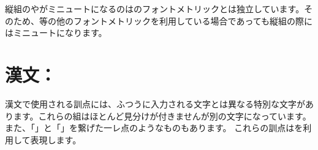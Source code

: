 \documentclass[uplatex, dvipdfmx, paper=a4paper, line_length=45zw, head_space=7zw, foot_space=10zw]{jlreq}
\begin{document}
縦組のやがミニュートになるのはのフォントメトリックとは独立しています。そのため、等の他のフォントメトリックを利用している場合であっても縦組の際にはミニュートになります。

\newpage
\section{漢文：\texorpdfstring{}{\textbackslash ajKunten}}

漢文で使用される訓点には、ふつうに入力される文字とは異なる特別な文字があります。これらの組はほとんど見分けが付きませんが別の文字になっています。
また、「」と「」を繋げた一レ点のようなものもあります。
これらの訓点はを利用して表現します。

\newcommand{\ajKuntenS}[3]{#2 {\rmfamily\normalsize\subUCN{#1}} & \ajKunten{#2} \subUCN{#3}}
\end{document}

